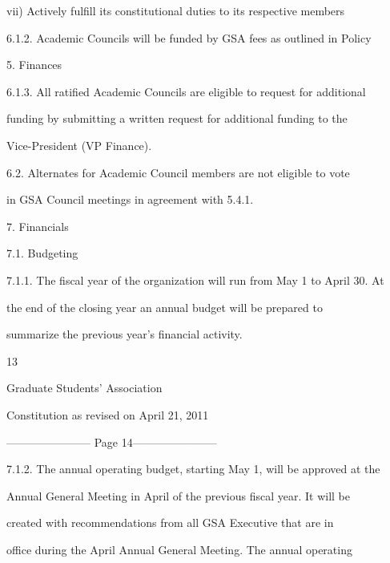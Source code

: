 vii)    Actively fulfill its constitutional duties to its respective members  



6.1.2. Academic Councils will be funded by GSA fees as outlined in Policy  

        5. Finances  



6.1.3. All  ratified  Academic  Councils  are  eligible  to  request  for  additional  

        funding  by submitting a written request for additional funding to the  

        Vice-President (VP Finance).  



6.2.         Alternates for Academic Council members are not eligible to  vote  

    in GSA Council meetings in agreement with  5.4.1.  



7.  Financials  



7.1.        Budgeting  



7.1.1. The fiscal year of the organization will run from May 1 to April 30. At  

        the  end  of  the  closing  year  an  annual  budget  will  be  prepared  to  

        summarize the previous year’s financial activity.  



                                                 

                                             13  



                               Graduate Students’ Association  



                          Constitution as revised on April 21, 2011  


----------------------- Page 14-----------------------

7.1.2. The annual operating budget, starting May 1, will be approved at the  

        Annual General Meeting in April of the previous fiscal year. It will be  

        created  with  recommendations  from  all  GSA  Executive  that  are  in  

        office during the April Annual General Meeting. The annual operating  

